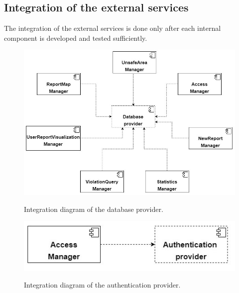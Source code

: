 \documentclass[../RASD.tex]{subfiles}
\begin{document}
    \subsection{Integration of the external services}\label{subsec:integration-of-the-external-services}
    The integration of the external services is done only after each internal component is developed and tested sufficiently.
    \begin{figure}[H]
        \centering
        \includegraphics[scale = 0.8]{assets/integration_diagrams/database_provider_integration.png}\\[1.6 cm]
        \caption[\textit{Integration} Diagram of the database provider]{Integration diagram of the database provider.}
    \end{figure}

    \begin{figure}[H]
        \centering
        \includegraphics[scale = 0.8]{assets/integration_diagrams/authentication_provider_integration.png}\\[1.6 cm]
        \caption[\textit{Integration} Diagram of the authentication provider]{Integration diagram of the authentication provider.}
    \end{figure}
\end{document}
